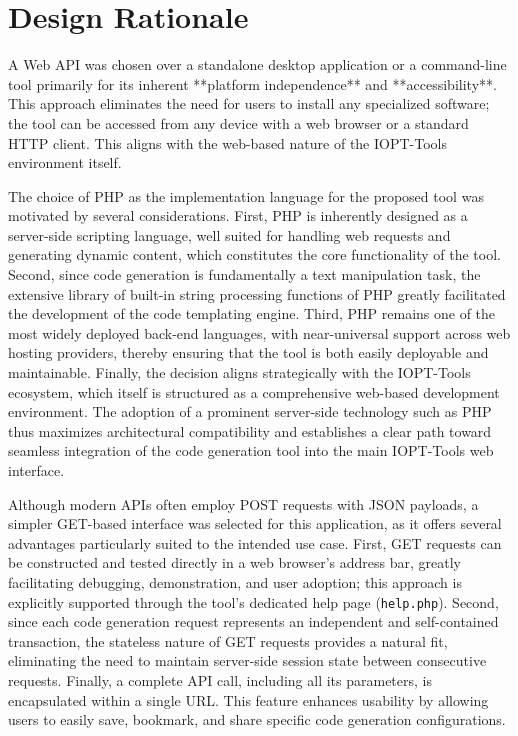 
\section{Design Rationale}
\label{sec:design_rationale}

A Web API was chosen over a standalone desktop application or a command-line tool primarily for its inherent **platform independence** and **accessibility**. This approach eliminates the need for users to install any specialized software; the tool can be accessed from any device with a web browser or a standard HTTP client. This aligns with the web-based nature of the IOPT-Tools environment itself.

The choice of PHP as the implementation language for the proposed tool was motivated by several considerations. First, PHP is inherently designed as a server-side scripting language, well suited for handling web requests and generating dynamic content, which constitutes the core functionality of the tool. Second, since code generation is fundamentally a text manipulation task, the extensive library of built-in string processing functions of PHP greatly facilitated the development of the code templating engine. Third, PHP remains one of the most widely deployed back-end languages, with near-universal support across web hosting providers, thereby ensuring that the tool is both easily deployable and maintainable. Finally, the decision aligns strategically with the IOPT-Tools ecosystem, which itself is structured as a comprehensive web-based development environment. The adoption of a prominent server-side technology such as PHP thus maximizes architectural compatibility and establishes a clear path toward seamless integration of the code generation tool into the main IOPT-Tools web interface.

Although modern APIs often employ POST requests with JSON payloads, a simpler GET-based interface was selected for this application, as it offers several advantages particularly suited to the intended use case. First, GET requests can be constructed and tested directly in a web browser's address bar, greatly facilitating debugging, demonstration, and user adoption; this approach is explicitly supported through the tool’s dedicated help page (\texttt{help.php}). Second, since each code generation request represents an independent and self-contained transaction, the stateless nature of GET requests provides a natural fit, eliminating the need to maintain server-side session state between consecutive requests. Finally, a complete API call, including all its parameters, is encapsulated within a single URL. This feature enhances usability by allowing users to easily save, bookmark, and share specific code generation configurations.




